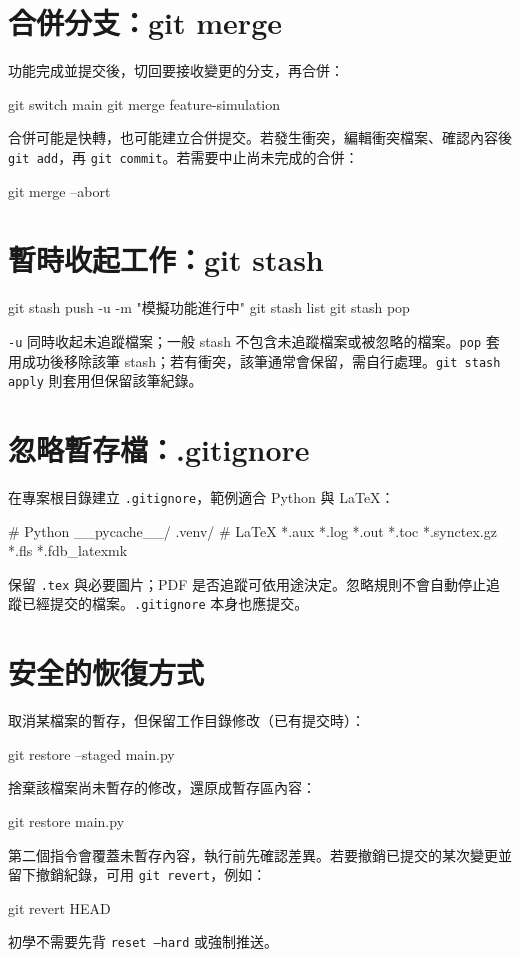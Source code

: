 \documentclass[UTF8,fontset=fandol,11pt,a4paper]{ctexart}
\begin{document}
\section{合併分支：git merge}
功能完成並提交後，切回要接收變更的分支，再合併：
\begin{code}
    git switch main
    git merge feature-simulation
\end{code}
合併可能是快轉，也可能建立合併提交。若發生衝突，編輯衝突檔案、確認內容後 \texttt{git add}，再 \texttt{git commit}。若需要中止尚未完成的合併：
\begin{code}
    git merge --abort
\end{code}
\section{暫時收起工作：git stash}
\begin{code}
    git stash push -u -m "模擬功能進行中"
    git stash list
    git stash pop
\end{code}
\texttt{-u} 同時收起未追蹤檔案；一般 stash 不包含未追蹤檔案或被忽略的檔案。\texttt{pop} 套用成功後移除該筆 stash；若有衝突，該筆通常會保留，需自行處理。\texttt{git stash apply} 則套用但保留該筆紀錄。
\section{忽略暫存檔：.gitignore}
在專案根目錄建立 \texttt{.gitignore}，範例適合 Python 與 LaTeX：
\begin{code}
    # Python
    __pycache__/
    .venv/
    # LaTeX
    *.aux
    *.log
    *.out
    *.toc
    *.synctex.gz
    *.fls
    *.fdb_latexmk
\end{code}
保留 \texttt{.tex} 與必要圖片；PDF 是否追蹤可依用途決定。忽略規則不會自動停止追蹤已經提交的檔案。\texttt{.gitignore} 本身也應提交。
\section{安全的恢復方式}
取消某檔案的暫存，但保留工作目錄修改（已有提交時）：
\begin{code}
    git restore --staged main.py
\end{code}
捨棄該檔案尚未暫存的修改，還原成暫存區內容：
\begin{code}
    git restore main.py
\end{code}
第二個指令會覆蓋未暫存內容，執行前先確認差異。若要撤銷已提交的某次變更並留下撤銷紀錄，可用 \texttt{git revert}，例如：
\begin{code}
    git revert HEAD
\end{code}
初學不需要先背 \texttt{reset --hard} 或強制推送。
\end{document}
